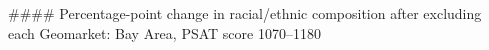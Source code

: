 #### Percentage-point change in racial/ethnic composition after excluding each Geomarket: Bay Area, PSAT score 1070–1180
